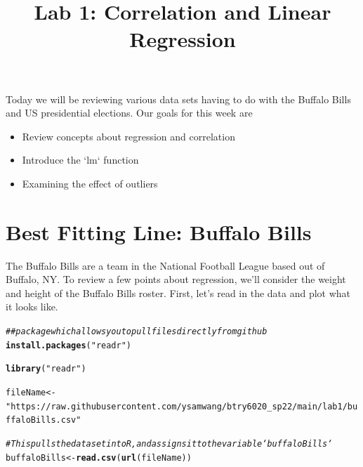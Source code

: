 \documentclass{article}\usepackage[]{graphicx}\usepackage[]{color}
\title{Lab 1: Correlation and Linear Regression}
\author{}
\makeatletter
\newcommand{\hlstr}[1]{\textcolor[rgb]{0.192,0.494,0.8}{#1}}%
\newcommand{\hlcom}[1]{\textcolor[rgb]{0.678,0.584,0.686}{\textit{#1}}}%
\newcommand{\hlstd}[1]{\textcolor[rgb]{0.345,0.345,0.345}{#1}}%
\newcommand{\hlkwb}[1]{\textcolor[rgb]{0.69,0.353,0.396}{#1}}%
\newcommand{\hlkwd}[1]{\textcolor[rgb]{0.737,0.353,0.396}{\textbf{#1}}}%
\newenvironment{kframe}{%
 \def\at@end@of@kframe{}%
 \ifinner\ifhmode%
  \def\at@end@of@kframe{\end{minipage}}%
  \begin{minipage}{\columnwidth}%
 \fi\fi%
 \def\FrameCommand##1{\hskip\@totalleftmargin \hskip-\fboxsep
 \colorbox{shadecolor}{##1}\hskip-\fboxsep
     \hskip-\linewidth \hskip-\@totalleftmargin \hskip\columnwidth}%
 \MakeFramed {\advance\hsize-\width
   \@totalleftmargin\z@ \linewidth\hsize
   \@setminipage}}%
 {\par\unskip\endMakeFramed%
 \at@end@of@kframe}
\newenvironment{knitrout}{}{} %
\makeatother
\begin{document}
\maketitle  

Today we will be reviewing various data sets having to do with the Buffalo Bills and US presidential elections. Our goals for this week are

\begin{itemize}
\item Review concepts about regression and correlation
\item Introduce the `lm` function
\item Examining the effect of outliers
\end{itemize}

\section{Best Fitting Line: Buffalo Bills}

The Buffalo Bills are a team in the National Football League based out of Buffalo, NY. To review a few points about regression, we'll consider the weight and height of the Buffalo Bills roster. First, let's read in the data and plot what it looks like.


\begin{knitrout}
\color{fgcolor}\begin{kframe}
\begin{alltt}
\hlcom{## package which allows you to pull files directly from github}
\hlkwd{install.packages}\hlstd{(}\hlstr{"readr"}\hlstd{)}
\end{alltt}


{\ttfamily\noindent\itshape\color{messagecolor}{\#\# Installing package into '/home/ysw7/R/x86\_64-pc-linux-gnu-library/4.1'\\\#\# (as 'lib' is unspecified)}}\begin{alltt}
\hlkwd{library}\hlstd{(}\hlstr{"readr"}\hlstd{)}

\hlstd{fileName} \hlkwb{<-} \hlstr{"https://raw.githubusercontent.com/ysamwang/btry6020_sp22/main/lab1/buffaloBills.csv"}

\hlcom{# This pulls the data set into R, and assigns it to the variable `buffaloBills`}
\hlstd{buffaloBills} \hlkwb{<-} \hlkwd{read.csv}\hlstd{(}\hlkwd{url}\hlstd{(fileName))}
\end{alltt}
\end{kframe}
\end{knitrout}
\end{document}
